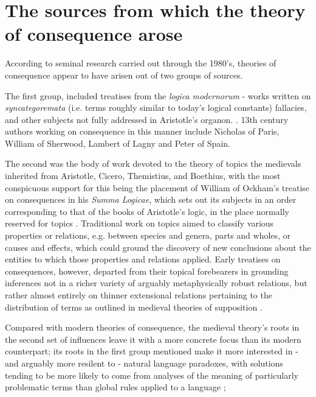 \documentclass[]{article}
\begin{document}
\section{The sources from which the theory of consequence arose}
According to seminal research carried out through the 1980's,
theories of consequence appear to have arisen out of two groups of sources. 

The first group, 
included treatises 
from the \emph{logica modernorum} 
- 
works written on 
\emph{syncategoremata} (i.e. terms roughly similar to today's logical constants) 
fallacies,
and other subjects not fully addressed in Aristotle's organon. 
\autocite{Green-Pedersen1984,Spruyt2018}.
13th century authors working on consequence in this manner include 
Nicholas of Paris, 
William of Sherwood, 
Lambert of Lagny 
and Peter of Spain.

The second was the body of work devoted to the theory of topics the medievals inherited from Aristotle, 
Cicero, 
Themistius, 
and Boethius, 
with the most conspicuous support for this being the placement of William of Ockham's treatise on consequences in his \emph{Summa Logicae}, 
which sets out its subjects in an order corresponding to that of the books of Aristotle's logic, 
in the place normally reserved for topics \autocite{Stump1982,OckhamSL}. 
Traditional work on topics aimed to classify various properties or relations, 
e.g. between species and genera, 
parts and wholes, 
or causes and effects, 
which could ground the discovery of new conclusions about the entities to which those properties and relations applied. 
Early treatises on consequences, 
however, 
departed from their topical forebearers in 
grounding inferences not in a richer variety of arguably metaphysically robust relations, but rather almost entirely on thinner extensional relations pertaining to the distribution of terms as outlined in medieval theories of supposition \autocite{HodgesBurley,Archambault2022,sep-medieval-terms}. 

Compared with modern theories of consequence, 
the medieval theory's roots 
in the second set of influences leave it with a more concrete focus than its modern counterpart;
its roots 
in the first group mentioned 
make it more interested in 
- and arguably more resilent to - 
natural language paradoxes, 
with solutions tending to be more likely to come from analyses of the meaning of particularly problematic terms than global rules applied to a language \autocite{Klima2004,Klima2016}; 
\end{document}
